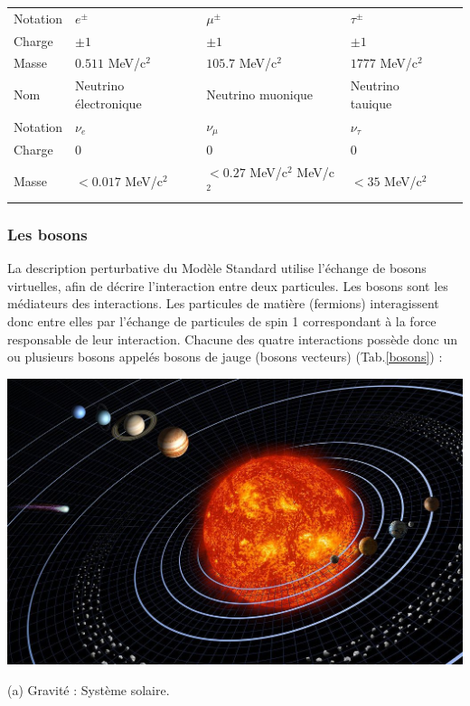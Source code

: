\begin{table}[H]
\begin{tabular}{|O|O|O|O|N}
 Notation &  $e^{\pm}$ &  $\mu^{\pm}$ &  $\tau^{\pm}$ \\
 Charge &  $\pm 1$ &  $\pm 1$ &  $\pm 1$ \\
 Masse &  $0.511$ MeV/c$^2$ &  $105.7$ MeV/c$^2$ &  $1777$ MeV/c$^2$ \\
\hline 
{} Nom &  Neutrino électronique &  Neutrino muonique &  Neutrino tauique \\
 Notation &  $\nu_{e}$ &  $\nu_{\mu}$ &  $\nu_{\tau}$ \\
 Charge &  $0$ &  $0$ &  $0$ \\
 Masse &  $<0.017$ MeV/c$^2$ &  $<0.27$ MeV/c$^2$ MeV/c$^2$ &  $<35$ MeV/c$^2$ \\

\hline
\end{tabular} 
\label{fermions}
\end{table}	

\subsubsection{Les bosons}
La description perturbative du Modèle Standard utilise l'échange de bosons virtuelles, afin de décrire l'interaction entre deux particules. Les bosons sont les médiateurs des interactions. Les particules de matière (fermions) interagissent donc entre elles par l'échange de particules de spin 1 correspondant à la force responsable de leur interaction.
\smallskip
Chacune des quatre interactions possède donc un ou plusieurs bosons appelés bosons de jauge (bosons vecteurs) (Tab.\ref{bosons}) :

\marginpar
{
\begin{center}
\includegraphics[width=\marginparwidth]{SM/solaire.jpg}
\begin{center}\normalfont\small {(a) Gravité : Système solaire.}\end{center}
\end{center}
}

